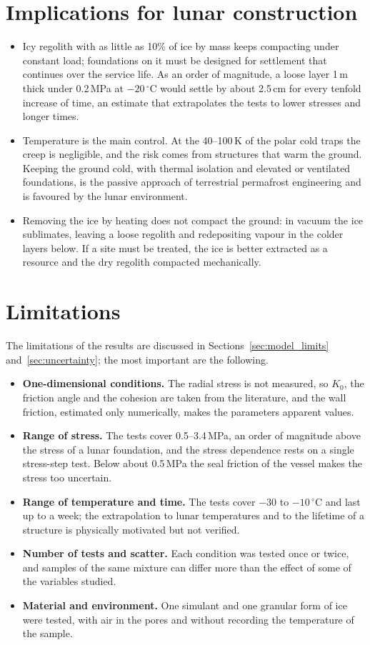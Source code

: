 \section{Implications for lunar construction}
\begin{itemize}
    \item Icy regolith with as little as 10\% of ice by mass keeps compacting under constant load; foundations on it must be designed for settlement that continues over the service life. As an order of magnitude, a loose layer 1\,m thick under 0.2\,MPa at $-20\,^\circ$C would settle by about 2.5\,cm for every tenfold increase of time, an estimate that extrapolates the tests to lower stresses and longer times.
    \item Temperature is the main control. At the 40--100\,K of the polar cold traps the creep is negligible, and the risk comes from structures that warm the ground. Keeping the ground cold, with thermal isolation and elevated or ventilated foundations, is the passive approach of terrestrial permafrost engineering and is favoured by the lunar environment.
    \item Removing the ice by heating does not compact the ground: in vacuum the ice sublimates, leaving a loose regolith and redepositing vapour in the colder layers below. If a site must be treated, the ice is better extracted as a resource and the dry regolith compacted mechanically.
\end{itemize}

\section{Limitations}

The limitations of the results are discussed in Sections~\ref{sec:model_limits} and~\ref{sec:uncertainty}; the most important are the following.
\begin{itemize}
    \item \textbf{One-dimensional conditions.} The radial stress is not measured, so $K_0$, the friction angle and the cohesion are taken from the literature, and the wall friction, estimated only numerically, makes the parameters apparent values.
    \item \textbf{Range of stress.} The tests cover 0.5--3.4\,MPa, an order of magnitude above the stress of a lunar foundation, and the stress dependence rests on a single stress-step test. Below about 0.5\,MPa the seal friction of the vessel makes the stress too uncertain.
    \item \textbf{Range of temperature and time.} The tests cover $-30$ to $-10\,^\circ$C and last up to a week; the extrapolation to lunar temperatures and to the lifetime of a structure is physically motivated but not verified.
    \item \textbf{Number of tests and scatter.} Each condition was tested once or twice, and samples of the same mixture can differ more than the effect of some of the variables studied.
    \item \textbf{Material and environment.} One simulant and one granular form of ice were tested, with air in the pores and without recording the temperature of the sample.
\end{itemize}

